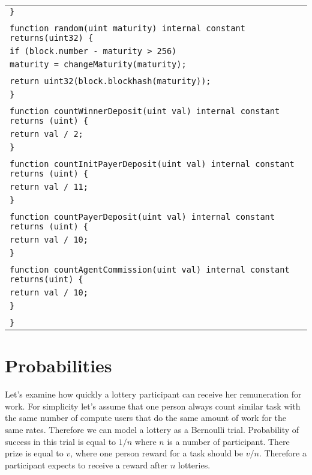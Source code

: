 \documentclass[a4paper]{article}
\begin{document}
\begin{tabularx}{\linewidth}{l}
        \qquad\texttt{\}}\\
        \\
        \qquad\texttt{function random(uint maturity) internal constant returns(uint32) \{}\\
        \qquad\qquad\texttt{if (block.number - maturity > 256)}\\
        \qquad\qquad\qquad\texttt{maturity = changeMaturity(maturity);}\\
        \\
        \qquad\qquad\texttt{return uint32(block.blockhash(maturity));}\\
        \qquad\texttt{\}}\\
        \\
        \qquad\texttt{function countWinnerDeposit(uint val) internal constant returns (uint) \{}\\
        \qquad\qquad\texttt{return val / 2;}\\
        \qquad\texttt{\}}\\
        \\
        \qquad\texttt{function countInitPayerDeposit(uint val) internal constant returns (uint) \{}\\
        \qquad\qquad\texttt{return val / 11;}\\
        \qquad\texttt{\}}\\
        \\
        \qquad\texttt{function countPayerDeposit(uint val) internal constant returns (uint) \{}\\
        \qquad\qquad\texttt{return val / 10;}\\
        \qquad\texttt{\}}\\
        \\
        \qquad\texttt{function countAgentCommission(uint val) internal constant returns(uint) \{}\\
        \qquad\qquad\texttt{return val / 10;}\\
        \qquad\texttt{\}}\\
        \\
        \texttt{\}}\\
    \end{tabularx}

\section{Probabilities}

    Let's examine how quickly a lottery participant can receive her remuneration for work. For simplicity let's assume
    that one person always count similar task with the same number of compute users that do the same amount of work
    for the same rates. Therefore we can model a lottery as a Bernoulli trial. Probability of success in this trial is
    equal to $1/n$ where $n$ is a number of participant. There prize is equal to $v$, where one person reward for a
    task should be $v/n$. Therefore a participant expects to receive a reward after $n$ lotteries.
\end{document}
